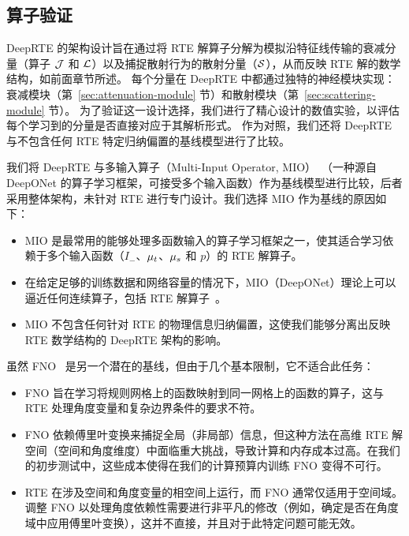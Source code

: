 \subsection{算子验证}\label{sec:ablation-study}

DeepRTE 的架构设计旨在通过将 RTE 解算子分解为模拟沿特征线传输的衰减分量（算子 $\mathcal{J}$ 和 $\mathcal{L}$）以及捕捉散射行为的散射分量（$\mathcal{S}$），从而反映 RTE 解的数学结构，如前面章节所述。
每个分量在 DeepRTE 中都通过独特的神经模块实现：衰减模块（第~\ref{sec:attenuation-module} 节）和散射模块（第~\ref{sec:scattering-module} 节）。
为了验证这一设计选择，我们进行了精心设计的数值实验，以评估每个学习到的分量是否直接对应于其解析形式。
作为对照，我们还将 DeepRTE 与不包含任何 RTE 特定归纳偏置的基线模型进行了比较。

我们将 DeepRTE 与多输入算子（Multi-Input Operator, MIO）~\cite{jin2022mionet}（一种源自 DeepONet 的算子学习框架，可接受多个输入函数）作为基线模型进行比较，后者采用整体架构，未针对 RTE 进行专门设计。我们选择 MIO 作为基线的原因如下：
\begin{itemize}
    \item MIO 是最常用的能够处理多函数输入的算子学习框架之一，使其适合学习依赖于多个输入函数（$I_-$、$\mu_t$、$\mu_s$ 和 $p$）的 RTE 解算子。
    \item 在给定足够的训练数据和网络容量的情况下，MIO（DeepONet）理论上可以逼近任何连续算子，包括 RTE 解算子~\cite{lu2021learning}。
    \item MIO 不包含任何针对 RTE 的物理信息归纳偏置，这使我们能够分离出反映 RTE 数学结构的 DeepRTE 架构的影响。
\end{itemize}
虽然 FNO~\cite{li2020fourier} 是另一个潜在的基线，但由于几个基本限制，它不适合此任务：
\begin{itemize}
    \item FNO 旨在学习将规则网格上的函数映射到同一网格上的函数的算子，这与 RTE 处理角度变量和复杂边界条件的要求不符。
    \item FNO 依赖傅里叶变换来捕捉全局（非局部）信息，但这种方法在高维 RTE 解空间（空间和角度维度）中面临重大挑战，导致计算和内存成本过高。在我们的初步测试中，这些成本使得在我们的计算预算内训练 FNO 变得不可行。
    \item RTE 在涉及空间和角度变量的相空间上运行，而 FNO 通常仅适用于空间域。调整 FNO 以处理角度依赖性需要进行非平凡的修改（例如，确定是否在角度域中应用傅里叶变换），这并不直接，并且对于此特定问题可能无效。
\end{itemize}

